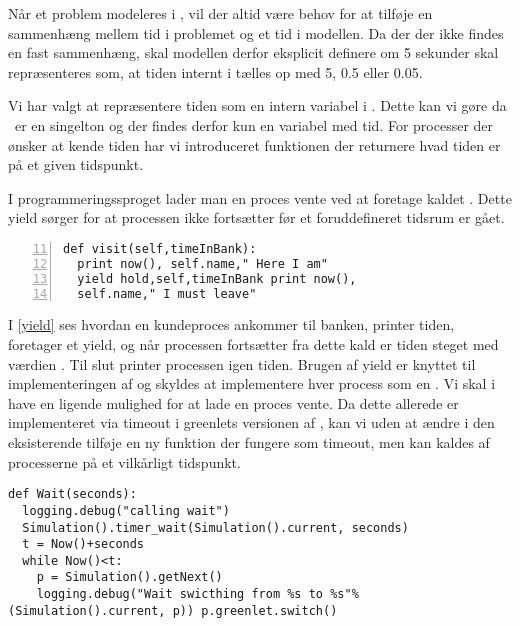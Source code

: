 Når et problem modeleres i \des, vil der altid være behov for at
tilføje en sammenhæng mellem tid i problemet og et tid i modellen. Da
der der ikke findes en fast sammenhæng, skal modellen derfor eksplicit
definere om 5 sekunder skal repræsenteres som, at tiden internt i
\pycsp tælles op med 5, 0.5 eller 0.05.

Vi har valgt at repræsentere tiden som en intern variabel i \sched.
Dette kan vi gøre da \sched ~er en singelton og der findes derfor kun
en variabel med tid. For processer der ønsker at kende tiden har vi
introduceret funktionen  der returnere hvad tiden er på et
given tidspunkt.




I programmeringssproget \simpy lader man en proces vente ved at
foretage kaldet . Dette yield sørger for at processen ikke
fortsætter før et foruddefineret tidsrum er gået.

\begin{lstlisting}[firstnumber=11 , stepnumber=2, numbers=left,float=hbtp, label=yield, caption= Et yield i \simpy (Taget fra Bank05.py i eksemplet fra \simpy)] 
def visit(self,timeInBank): 
  print now(), self.name," Here I am" 
  yield hold,self,timeInBank print now(),
  self.name," I must leave" 
\end{lstlisting}

I \cref{yield} ses hvordan en kundeproces ankommer til banken,
printer tiden, foretager et yield, og når processen fortsætter
fra dette kald er tiden steget med værdien .
Til slut printer processen igen tiden. Brugen af yield er knyttet
til implementeringen af \simpy og skyldes at \simpy implementere
hver process som en . Vi skal i \pycsp have en
ligende mulighed for at lade en proces vente. Da dette allerede er
implementeret via timeout i greenlets versionen af \pycsp, kan vi
uden at ændre i den eksisterende \sched tilføje en ny funktion
 der fungere som timeout, men kan kaldes af processerne
på et vilkårligt tidspunkt. 

\begin{lstlisting}[firstnumber=20,float=hbtp, label=wait, caption=Wait i simuleringsversionen.] 
def Wait(seconds): 
  logging.debug("calling wait")
  Simulation().timer_wait(Simulation().current, seconds) 
  t = Now()+seconds
  while Now()<t: 
    p = Simulation().getNext() 
    logging.debug("Wait swicthing from %s to %s"%(Simulation().current, p)) p.greenlet.switch()
\end{lstlisting}

